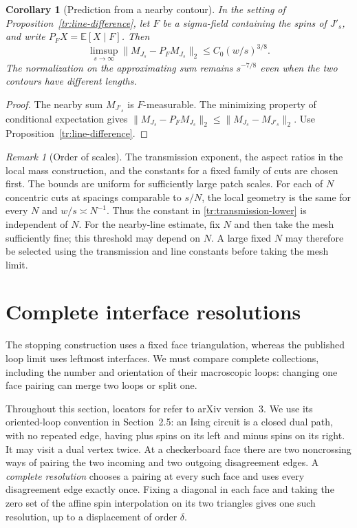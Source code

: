 \documentclass[11pt]{article}
\newtheorem{corollary}[theorem]{Corollary}
\theoremstyle{definition}
\theoremstyle{remark}
\newtheorem{remark}[theorem]{Remark}
\numberwithin{equation}{section}
\begin{document}
\begin{corollary}[Prediction from a nearby contour]
\label{tr:line-regularity}
In the setting of Proposition~\ref{tr:line-difference}, let $F$ be a
sigma-field containing the spins of $J'_s$, and write
$P_FX=\mathbb E[X\mid F]$. Then
\begin{equation}
\label{tr:line-regularity-eq}
 \limsup_{s\to\infty}\|M_{J_s}-P_FM_{J_s}\|_2
 \leq C_0(w/s)^{3/8}.
\end{equation}
The normalization on the approximating sum remains $s^{-7/8}$ even
when the two contours have different lengths.
\end{corollary}

\begin{proof}
The nearby sum $M_{J'_s}$ is $F$-measurable. The minimizing property of
conditional expectation gives
$\|M_{J_s}-P_FM_{J_s}\|_2\leq\|M_{J_s}-M_{J'_s}\|_2$.
Use Proposition~\ref{tr:line-difference}.
\end{proof}


\begin{remark}[Order of scales]\label{tr:quantifiers}
The transmission exponent, the aspect ratios in the local mass construction,
and the constants for a fixed family of cuts are chosen first. The bounds
are uniform for sufficiently large patch scales. For each of $N$ concentric cuts
at spacings comparable to $s/N$, the local geometry is the same for every
$N$ and $w/s\asymp N^{-1}$. Thus the constant in
\eqref{tr:transmission-lower} is independent of $N$. For the nearby-line
estimate, fix $N$ and then take the mesh sufficiently fine; this threshold
may depend on $N$. A large fixed $N$ may therefore be selected using the
transmission and line constants before taking the mesh limit.
\end{remark}

\section{Complete interface resolutions}\label{re:section}

The stopping construction uses a fixed face triangulation, whereas the
published loop limit uses leftmost interfaces. We must compare complete
collections, including the number and orientation of their macroscopic
loops: changing one face pairing can merge two loops or split one.

Throughout this section, locators for \cite{BH2019} refer to
arXiv version~3. We use its oriented-loop convention in Section~2.5: an
Ising circuit is a closed dual path, with no repeated edge, having plus
spins on its left and minus spins on its right.  It may visit a dual
vertex twice.  At a checkerboard face there are two noncrossing ways of
pairing the two incoming and two outgoing disagreement edges.  A
\emph{complete resolution} chooses a pairing at every such face and
uses every disagreement edge exactly once. Fixing a diagonal in each
face and taking the zero set of the affine spin interpolation on its
two triangles gives one such resolution, up to a displacement of order
$\delta$.
\end{document}
